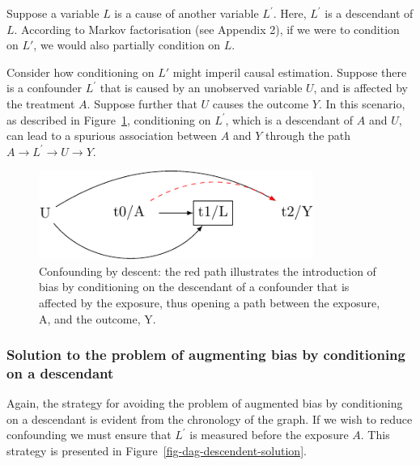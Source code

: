 \documentclass[
  singlecolumn,
  9pt]{article}
\begin{document}
Suppose a variable \(L\) is a cause of another variable \(L^\prime\).
Here, \(L^\prime\) is a descendant of \(L\). According to Markov
factorisation (see Appendix 2), if we were to condition on \(L\prime\),
we would also partially condition on \(L\).

Consider how conditioning on \(L\prime\) might imperil causal
estimation. Suppose there is a confounder \(L^\prime\) that is caused by
an unobserved variable \(U\), and is affected by the treatment \(A\).
Suppose further that \(U\) causes the outcome \(Y\). In this scenario,
as described in Figure~\ref{fig-dag-descendent}, conditioning on
\(L^\prime\), which is a descendant of \(A\) and \(U\), can lead to a
spurious association between \(A\) and \(Y\) through the path
\(A \to L^\prime \to U \to Y\).

\begin{figure}

{\centering \includegraphics[width=0.8\textwidth,height=\textheight]{causal-dags_files/figure-pdf/fig-dag-descendent-1.pdf}

}

\caption{\label{fig-dag-descendent}Confounding by descent: the red path
illustrates the introduction of bias by conditioning on the descendant
of a confounder that is affected by the exposure, thus opening a path
between the exposure, A, and the outcome, Y.}

\end{figure}

\subsubsection{Solution to the problem of augmenting bias by
conditioning on a
descendant}\label{solution-to-the-problem-of-augmenting-bias-by-conditioning-on-a-descendant}

Again, the strategy for avoiding the problem of augmented bias by
conditioning on a descendant is evident from the chronology of the
graph. If we wish to reduce confounding we must ensure that \(L^\prime\)
is measured before the exposure \(A\). This strategy is presented in
Figure~\ref{fig-dag-descendent-solution}.
\end{document}
